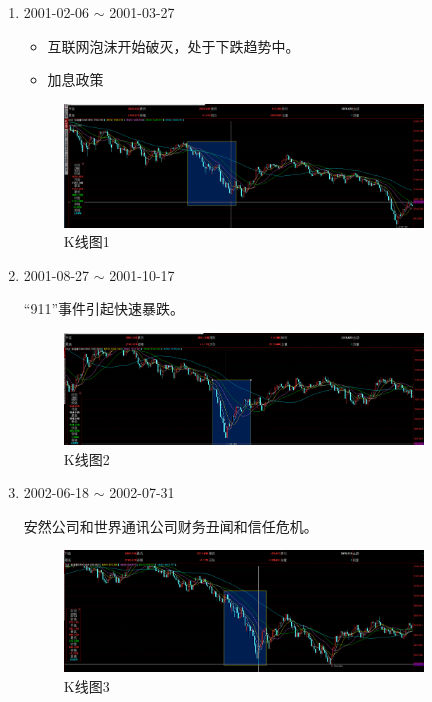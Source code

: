 \documentclass[12pt,a4paper]{article}
\begin{document}
	\begin{enumerate}
		\item 2001-02-06 $\sim$ 2001-03-27 
			\begin{itemize}
				\item  互联网泡沫开始破灭，处于下跌趋势中。
				\item  加息政策
			\end{itemize}
		
		\begin{figure}[H]
			\centering
			\includegraphics[width=0.9\textwidth]{img/51.png}%
			\caption{K线图1}
		\end{figure}
		
		\item 2001-08-27 $\sim$ 2001-10-17
		
		“911”事件引起快速暴跌。
		
		\begin{figure}[H]
			\centering
			\includegraphics[width=0.9\textwidth]{img/52.png}%
			\caption{K线图2}
		\end{figure}		
		
		\item 2002-06-18 $\sim$ 2002-07-31
		
		安然公司和世界通讯公司财务丑闻和信任危机。
		
		\begin{figure}[H]
			\centering
			\includegraphics[width=0.9\textwidth]{img/53.png}%
			\caption{K线图3}
		\end{figure}
		

\end{enumerate}
\end{document}
